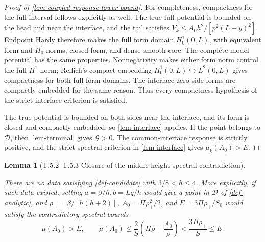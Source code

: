 \documentclass[11pt,a4paper]{article}
\theoremstyle{proofmanuscript}
\newtheorem{lemma}[theorem]{Lemma}
\begin{document}
\begin{proof}[Proof of \ref{lem-coupled-response-lower-bound}]
For completeness, compactness for the full interval follows explicitly as well. The true full potential is bounded on the head and near the interface, and the tail satisfies \(V_k\le A_0h^2/[p^2(L-y)^2]\). Endpoint Hardy therefore makes the full form domain \(H_0^1(0,L)\), with equivalent form and \(H_0^1\) norms, closed form, and dense smooth core. The complete model potential has the same properties. Nonnegativity makes either form norm control the full \(H^1\) norm; Rellich's compact embedding \(H_0^1(0,L)\hookrightarrow L^2(0,L)\) gives compactness for both full form domains. The interface-zero side forms are compactly embedded for the same reason. Thus every compactness hypothesis of the strict interface criterion is satisfied.

The true potential is bounded on both sides near the interface, and its form is closed and compactly embedded, so \ref{lem-interface} applies. If the point belongs to \(\mathcal D\), then \ref{lem-terminal} gives \(\mathcal G>0\). The common-interface response is strictly positive, and the strict spectral criterion in \ref{lem-interface} gives \(\mu_k(A_0)>E\).

\end{proof}

\begin{lemma}[T.5.2--T.5.3 Closure of the middle-height spectral contradiction]\label{lem-middle-spectral-closure}

There are no data satisfying \ref{def-candidate} with \(3/8<h\le4\). More explicitly, if such data existed, setting \(a=\beta/h,b=Lq/h\) would give a point in \(\mathcal D\) of \ref{def-analytic}, and \(\rho_+=\beta/[h(h+2)]\), \(A_0=\Pi\rho_+^2/2\), and \(\overline E=3\Pi\rho_+/S_0\) would satisfy the contradictory spectral bounds \[
\mu(A_0)>\overline E,\qquad
\mu(A_0)\le\frac2S\left(\Pi\rho+\frac{A_0}{\rho}\right)
<\frac{3\Pi\rho_+}{S}\le\overline E.
\]

\end{lemma}
\end{document}
